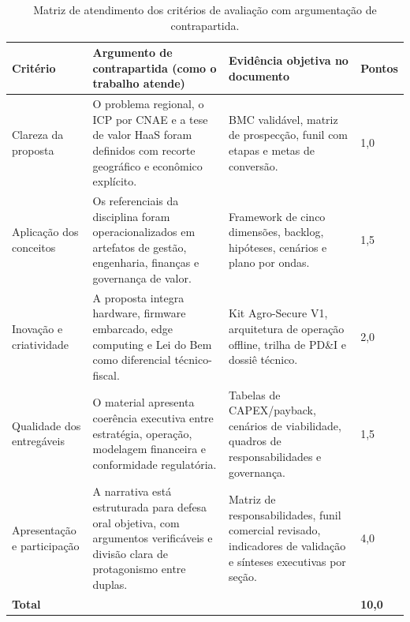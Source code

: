 \begin{table}[htb]
\centering
\caption{Matriz de atendimento dos critérios de avaliação com argumentação de contrapartida.}
\label{tab:criterios-avaliacao}
\begin{tabular}{|p{}|p{}|p{}|p{}|}
\hline
\textbf{Critério} & \textbf{Argumento de contrapartida (como o trabalho atende)} & \textbf{Evidência objetiva no documento} & \textbf{Pontos} \\
\hline
Clareza da proposta & O problema regional, o ICP por CNAE e a tese de valor HaaS foram definidos com recorte geográfico e econômico explícito. & BMC validável, matriz de prospecção, funil com etapas e metas de conversão. & 1,0 \\
\hline
Aplicação dos conceitos & Os referenciais da disciplina foram operacionalizados em artefatos de gestão, engenharia, finanças e governança de valor. & Framework de cinco dimensões, backlog, hipóteses, cenários e plano por ondas. & 1,5 \\
\hline
Inovação e criatividade & A proposta integra hardware, firmware embarcado, edge computing e Lei do Bem como diferencial técnico-fiscal. & Kit Agro-Secure V1, arquitetura de operação offline, trilha de PD\&I e dossiê técnico. & 2,0 \\
\hline
Qualidade dos entregáveis & O material apresenta coerência executiva entre estratégia, operação, modelagem financeira e conformidade regulatória. & Tabelas de CAPEX/payback, cenários de viabilidade, quadros de responsabilidades e governança. & 1,5 \\
\hline
Apresentação e participação & A narrativa está estruturada para defesa oral objetiva, com argumentos verificáveis e divisão clara de protagonismo entre duplas. & Matriz de responsabilidades, funil comercial revisado, indicadores de validação e sínteses executivas por seção. & 4,0 \\
\hline
\textbf{Total} &  &  & \textbf{10,0} \\
\hline
\end{tabular}
\end{table}